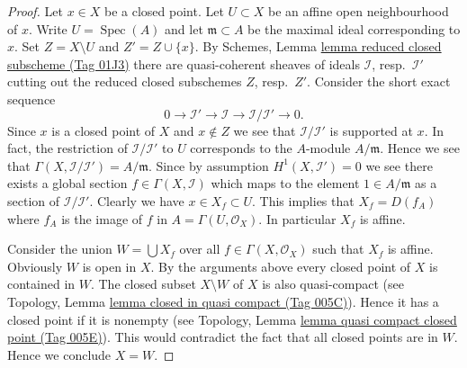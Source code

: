 \documentclass{amsart}
\theoremstyle{plain}
\theoremstyle{definition}
\theoremstyle{remark}
\numberwithin{equation}{subsection}
\def\Spec{\mathop{\mathrm{Spec}}}
\begin{document}
\begin{proof}
Let $x \in X$ be a closed point. Let $U \subset X$ be an affine open
neighbourhood of $x$. Write $U = \Spec(A)$ and let
$\mathfrak m \subset A$ be the maximal ideal corresponding to $x$.
Set $Z = X \setminus U$ and $Z' = Z \cup \{x\}$.
By Schemes, Lemma \href{https://stacks.math.columbia.edu/tag/01J3}{lemma reduced closed subscheme (Tag 01J3)} there
are quasi-coherent sheaves of ideals
$\mathcal{I}$, resp.\ $\mathcal{I}'$ cutting out
the reduced closed subschemes $Z$, resp.\ $Z'$.
Consider the short exact sequence
$$
0 \to \mathcal{I}' \to \mathcal{I} \to \mathcal{I}/\mathcal{I}' \to 0.
$$
Since $x$ is a closed point of $X$ and $x \not \in Z$ we see that
$\mathcal{I}/\mathcal{I}'$ is supported at $x$. In fact, the restriction
of $\mathcal{I}/\mathcal{I'}$ to $U$ corresponds to the $A$-module
$A/\mathfrak m$. Hence we see that $\Gamma(X, \mathcal{I}/\mathcal{I'})
= A/\mathfrak m$. Since by assumption $H^1(X, \mathcal{I}') = 0$
we see there exists a global section $f \in \Gamma(X, \mathcal{I})$
which maps to the element $1 \in A/\mathfrak m$ as a section of
$\mathcal{I}/\mathcal{I'}$. Clearly we have
$x \in X_f \subset U$. This implies that $X_f = D(f_A)$ where
$f_A$ is the image of $f$ in $A = \Gamma(U, \mathcal{O}_X)$.
In particular $X_f$ is affine.

\medskip\noindent
Consider the union $W = \bigcup X_f$ over all $f \in \Gamma(X, \mathcal{O}_X)$
such that $X_f$ is affine. Obviously $W$ is open in $X$.
By the arguments above every closed point of
$X$ is contained in $W$. The closed subset $X \setminus W$ of $X$
is also quasi-compact
(see Topology, Lemma \href{https://stacks.math.columbia.edu/tag/005C}{lemma closed in quasi compact (Tag 005C)}).
Hence it has a closed point if it is nonempty (see
Topology, Lemma \href{https://stacks.math.columbia.edu/tag/005E}{lemma quasi compact closed point (Tag 005E)}).
This would contradict the fact that all closed points are in
$W$. Hence we conclude $X = W$.


\end{proof}
\end{document}
